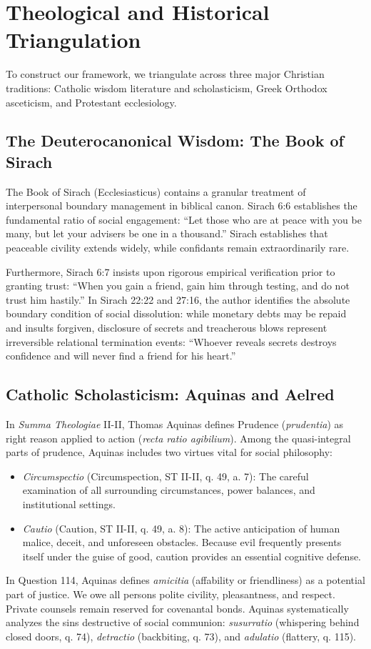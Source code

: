 \documentclass[11pt,twocolumn]{article}
\begin{document}
\section{Theological and Historical Triangulation}
To construct our framework, we triangulate across three major Christian traditions: Catholic wisdom literature and scholasticism, Greek Orthodox asceticism, and Protestant ecclesiology.

\subsection{The Deuterocanonical Wisdom: The Book of Sirach}
The Book of Sirach (Ecclesiasticus) contains a granular treatment of interpersonal boundary management in biblical canon. Sirach 6:6 establishes the fundamental ratio of social engagement: ``Let those who are at peace with you be many, but let your advisers be one in a thousand.'' Sirach establishes that peaceable civility extends widely, while confidants remain extraordinarily rare.

Furthermore, Sirach 6:7 insists upon rigorous empirical verification prior to granting trust: ``When you gain a friend, gain him through testing, and do not trust him hastily.'' In Sirach 22:22 and 27:16, the author identifies the absolute boundary condition of social dissolution: while monetary debts may be repaid and insults forgiven, disclosure of secrets and treacherous blows represent irreversible relational termination events: ``Whoever reveals secrets destroys confidence and will never find a friend for his heart.''

\subsection{Catholic Scholasticism: Aquinas and Aelred}
In \textit{Summa Theologiae} II-II, Thomas Aquinas defines Prudence (\textit{prudentia}) as right reason applied to action (\textit{recta ratio agibilium}). Among the quasi-integral parts of prudence, Aquinas includes two virtues vital for social philosophy:
\begin{itemize}
    \item \textit{Circumspectio} (Circumspection, ST II-II, q. 49, a. 7): The careful examination of all surrounding circumstances, power balances, and institutional settings.
    \item \textit{Cautio} (Caution, ST II-II, q. 49, a. 8): The active anticipation of human malice, deceit, and unforeseen obstacles. Because evil frequently presents itself under the guise of good, caution provides an essential cognitive defense.
\end{itemize}
In Question 114, Aquinas defines \textit{amicitia} (affability or friendliness) as a potential part of justice. We owe all persons polite civility, pleasantness, and respect. Private counsels remain reserved for covenantal bonds. Aquinas systematically analyzes the sins destructive of social communion: \textit{susurratio} (whispering behind closed doors, q. 74), \textit{detractio} (backbiting, q. 73), and \textit{adulatio} (flattery, q. 115).
\end{document}
